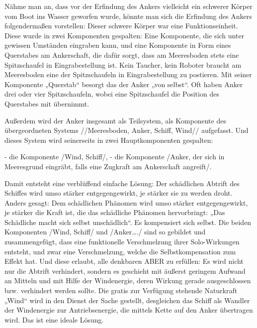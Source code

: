 \documentclass[12pt,a4paper]{article}
\begin{document}
Nähme man an, dass vor der Erfindung des Ankers vielleicht ein schwerer Körper vom Boot ins Wasser geworfen wurde, könnte man sich die Erfindung des Ankers folgendermaßen vorstellen: Dieser schwere Körper war eine Funktionseinheit. Diese wurde in zwei Komponenten gespalten: Eine Komponente, die sich unter gewissen Umständen eingraben kann, und eine Komponente in Form eines Querstabes am Ankerschaft, die dafür sorgt, dass am Meeresboden stets eine Spitzschaufel in Eingrabestellung ist. Kein Taucher, kein Roboter braucht am Meeresboden eine der Spitzschaufeln in Eingrabestellung zu postieren. Mit seiner Komponente „Querstab“ besorgt das der Anker „von selbst“. Oft haben Anker drei oder vier Spitzschaufeln, wobei eine Spitzschaufel die Position des Querstabes mit übernimmt.

Außerdem wird der Anker insgesamt als Teilsystem, als Komponente des übergeordneten Systems //Meeresboden, Anker, Schiff, Wind// aufgefasst. Und dieses System wird seinerseits in zwei Hauptkomponenten gespalten:

- die Komponente /Wind, Schiff/,
- die Komponente /Anker, der sich in Meeresgrund eingräbt, falls eine Zugkraft am Ankerschaft angreift/.

Damit entsteht eine verblüffend einfache Lösung: Der schädlichen Abtrift des Schiffes wird umso stärker entgegengewirkt, je stärker sie zu werden droht. Anders gesagt: Dem schädlichen Phänomen wird umso stärker entgegengewirkt, je stärker die Kraft ist, die das schädliche Phänomen hervorbringt: „Das Schädliche macht sich selbst unschädlich“. Es kompensiert sich selbst. Die beiden Komponenten /Wind, Schiff/ und /Anker…./ sind so gebildet und zusammengefügt, dass eine funktionelle Verschmelzung ihrer Solo-Wirkungen entsteht, und zwar eine Verschmelzung, welche die Selbstkompensation zum Effekt hat. Und diese erlaubt, alle denkbaren ABER zu erfüllen: Es wird nicht nur die Abtrift verhindert, sondern es geschieht mit äußerst geringem Aufwand an Mitteln und mit Hilfe der Windenergie, deren Wirkung gerade ausgeschlossen bzw. verhindert werden sollte. Die gratis zur Verfügung stehende Naturkraft „Wind“ wird in den Dienst der Sache gestellt, desgleichen das Schiff als Wandler der Windenergie zur Antriebsenergie, die mittels Kette auf den Anker übertragen wird. Das ist eine ideale Lösung.
\end{document}
